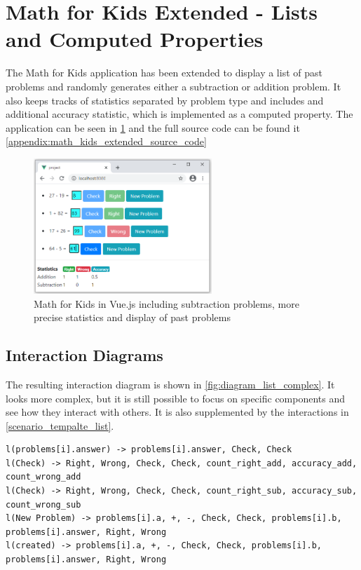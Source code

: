 \section{Math for Kids Extended - Lists and Computed Properties}
The Math for Kids application has been extended to display a list of past problems and randomly generates either a subtraction or addition problem. It also keeps tracks of statistics separated by problem type and includes and additional accuracy statistic, which is implemented as a computed property. The application can be seen in \ref{fig:eval_image_list_complex} and the full source code can be found it \ref{appendix:math_kids_extended_source_code}
\begin{figure}[H]
    \centering
    \includegraphics[width=0.6\textwidth]{images/math_for_kids_own_complex.png}
     \caption{Math for Kids in Vue.js including subtraction problems, more precise statistics and display of past problems }
     \label{fig:eval_image_list_complex}
\end{figure}

\subsection{Interaction Diagrams}
The resulting interaction diagram  is shown in \ref{fig:diagram_list_complex}. It looks more complex, but it is still possible to focus on specific components and see how they interact with others. It is also supplemented by the interactions  in \ref{scenario_tempalte_list}.

\label{scenario_tempalte_list}
\begin{lstlisting}[language=JavaScriptPlain]
l(problems[i].answer) -> problems[i].answer, Check, Check
l(Check) -> Right, Wrong, Check, Check, count_right_add, accuracy_add, count_wrong_add
l(Check) -> Right, Wrong, Check, Check, count_right_sub, accuracy_sub, count_wrong_sub
l(New Problem) -> problems[i].a, +, -, Check, Check, problems[i].b, problems[i].answer, Right, Wrong
l(created) -> problems[i].a, +, -, Check, Check, problems[i].b, problems[i].answer, Right, Wrong
\end{lstlisting}
